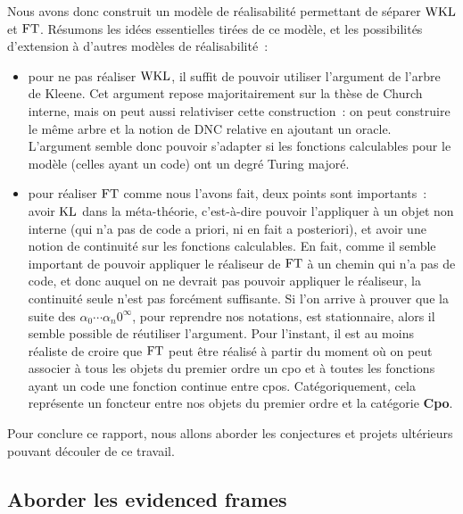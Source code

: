 \documentclass{article}
\begin{document}
Nous avons donc construit un modèle de réalisabilité permettant de séparer $\mathrm{WKL}$ et $\mathrm{FT}$. Résumons les idées essentielles tirées de ce modèle, et les possibilités d'extension à d'autres modèles de réalisabilité~:
\begin{itemize}
    \item pour ne pas réaliser $\mathrm{WKL}$, il suffit de pouvoir utiliser l'argument de l'arbre de Kleene. Cet argument repose majoritairement sur la thèse de Church interne, mais on peut aussi relativiser cette construction~: on peut construire le même arbre et la notion de DNC relative en ajoutant un oracle. L'argument semble donc pouvoir s'adapter si les fonctions calculables pour le modèle (celles ayant un code) ont un degré Turing majoré.
    \item pour réaliser $\mathrm{FT}$ comme nous l'avons fait, deux points sont importants~: avoir $\mathrm{KL}$ dans la méta-théorie, c'est-à-dire pouvoir l'appliquer à un objet non interne (qui n'a pas de code a priori, ni en fait a posteriori), et avoir une notion de continuité sur les fonctions calculables. En fait, comme il semble important de pouvoir appliquer le réaliseur de $\mathrm{FT}$ à un chemin qui n'a pas de code, et donc auquel on ne devrait pas pouvoir appliquer le réaliseur, la continuité seule n'est pas forcément suffisante. Si l'on arrive à prouver que la suite des $\alpha_0\cdots\alpha_n 0^\infty$, pour reprendre nos notations, est stationnaire, alors il semble possible de réutiliser l'argument. Pour l'instant, il est au moins réaliste de croire que $\mathrm{FT}$ peut être réalisé à partir du moment où on peut associer à tous les objets du premier ordre un cpo et à toutes les fonctions ayant un code une fonction continue entre cpos. Catégoriquement, cela représente un foncteur entre nos objets du premier ordre et la catégorie \textbf{Cpo}.
\end{itemize}

Pour conclure ce rapport, nous allons aborder les conjectures et projets ultérieurs pouvant découler de ce travail.

\subsection{Aborder les evidenced frames}
\end{document}
